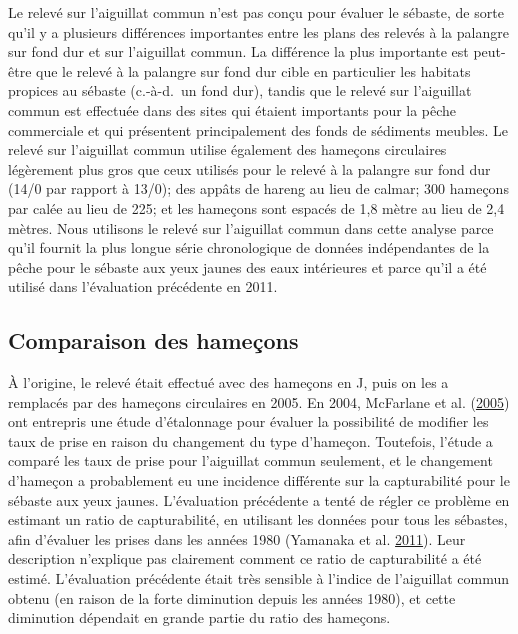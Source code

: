 \documentclass[french,11pt]{book}
\begin{document}
Le relevé sur l'aiguillat commun n'est pas conçu pour évaluer le sébaste, de sorte qu'il y a plusieurs différences importantes entre les plans des relevés à la palangre sur fond dur et sur l'aiguillat commun. La différence la plus importante est peut-être que le relevé à la palangre sur fond dur cible en particulier les habitats propices au sébaste (c.-à-d.~un fond dur), tandis que le relevé sur l'aiguillat commun est effectuée dans des sites qui étaient importants pour la pêche commerciale et qui présentent principalement des fonds de sédiments meubles. Le relevé sur l'aiguillat commun utilise également des hameçons circulaires légèrement plus gros que ceux utilisés pour le relevé à la palangre sur fond dur (14/0 par rapport à 13/0); des appâts de hareng au lieu de calmar; 300 hameçons par calée au lieu de 225; et les hameçons sont espacés de 1,8 mètre au lieu de 2,4 mètres. Nous utilisons le relevé sur l'aiguillat commun dans cette analyse parce qu'il fournit la plus longue série chronologique de données indépendantes de la pêche pour le sébaste aux yeux jaunes des eaux intérieures et parce qu'il a été utilisé dans l'évaluation précédente en 2011.

\hypertarget{sec:dog-hook-comparison}{%
\subsection{Comparaison des hameçons}\label{sec:dog-hook-comparison}}

À l'origine, le relevé était effectué avec des hameçons en J, puis on les a remplacés par des hameçons circulaires en 2005. En 2004, McFarlane et al. (\protect\hyperlink{ref-mcfarlane2005}{2005}) ont entrepris une étude d'étalonnage pour évaluer la possibilité de modifier les taux de prise en raison du changement du type d'hameçon. Toutefois, l'étude a comparé les taux de prise pour l'aiguillat commun seulement, et le changement d'hameçon a probablement eu une incidence différente sur la capturabilité pour le sébaste aux yeux jaunes. L'évaluation précédente a tenté de régler ce problème en estimant un ratio de capturabilité, en utilisant les données pour tous les sébastes, afin d'évaluer les prises dans les années 1980 (Yamanaka et al. \protect\hyperlink{ref-yamanaka2011}{2011}). Leur description n'explique pas clairement comment ce ratio de capturabilité a été estimé. L'évaluation précédente était très sensible à l'indice de l'aiguillat commun obtenu (en raison de la forte diminution depuis les années 1980), et cette diminution dépendait en grande partie du ratio des hameçons.
\end{document}

